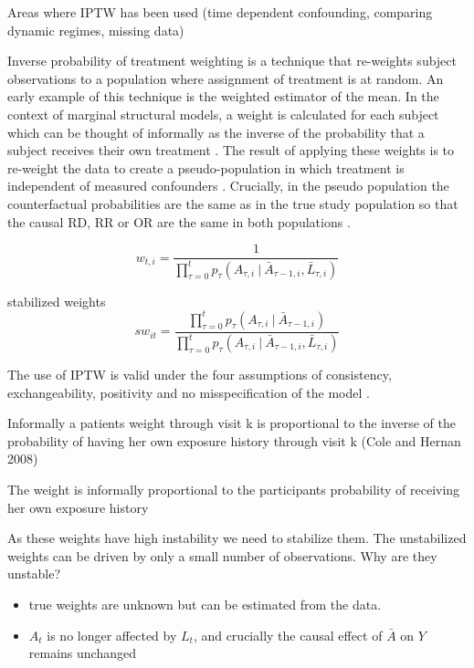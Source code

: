 \documentclass[11pt]{article}
\providecommand{\tightlist}{%
      \setlength{\itemsep}{0pt}\setlength{\parskip}{0pt}}
\begin{document}
\citet{Horvitz1952} Areas where IPTW has been used (time dependent
confounding, comparing dynamic regimes, missing data)

Inverse probability of treatment weighting is a technique that
re-weights subject observations to a population where assignment of
treatment is at random. An early example of this technique is the
\citet{Horovitz1952} weighted estimator of the mean. In the context of
marginal structural models, a weight is calculated for each subject
which can be thought of informally as the inverse of the probability
that a subject receives their own treatment \citet{Robins2000}. The
result of applying these weights is to re-weight the data to create a
pseudo-population in which treatment is independent of measured
confounders \citet{Cole2008}. Crucially, in the pseudo population the
counterfactual probabilities are the same as in the true study
population so that the causal RD, RR or OR are the same in both
populations \citet{Robins2000}.

\[w_{t,i} = \frac{1}{\prod_{\tau=0} ^ t p_{\tau} (A_{\tau, i}\ |\ \bar A_{\tau-1, i}, \bar L_{\tau, i})}\]

stabilized weights
\[sw_{it} = \frac{\prod_{\tau=0} ^ t p_{\tau} (A_{\tau, i}\ |\ \bar A_{\tau-1, i})} {\prod_{\tau=0} ^ t p_{\tau} (A_{\tau, i}\ |\ \bar A_{\tau-1, i}, \bar L_{\tau, i})}\]

The use of IPTW is valid under the four assumptions of consistency,
exchangeability, positivity and no misspecification of the model
\citet{Cole2008}.

Informally a patients weight through visit k is proportional to the
inverse of the probability of having her own exposure history through
visit k (Cole and Hernan 2008)

The weight is informally proportional to the participants probability of
receiving her own exposure history

As these weights have high instability we need to stabilize them. The
unstabilized weights can be driven by only a small number of
observations. Why are they unstable?

\begin{itemize}
\tightlist
\item
  true weights are unknown but can be estimated from the data.
\item
  \(A_t\) is no longer affected by \(L_t\), and crucially the causal
  effect of \(\bar A\) on \(Y\) remains unchanged
\end{itemize}
\end{document}

